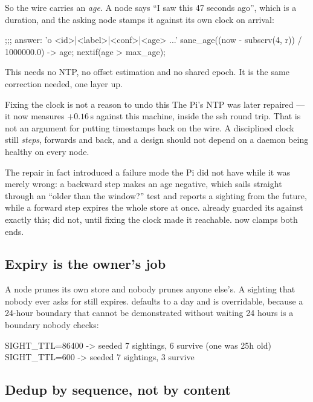 So the wire carries an \emph{age}. A node says ``I saw this 47 seconds ago'',
which is a duration, and the asking node stamps it against its own clock on
arrival:

\begin{pop}
;;; answer: 'o <id>|<label>|<conf>|<age> ...'
sane_age((now - subscrv(4, r)) / 1000000.0) -> age;
nextif(age > max_age);
\end{pop}

\noindent This needs no NTP, no offset estimation and no shared epoch. It is
the same correction  needed, one layer up.

\begin{callout}{Fixing the clock is not a reason to undo this}
The Pi's NTP was later repaired --- it now measures $+0.16$\,s against this
machine, inside the ssh round trip. That is not an argument for putting
timestamps back on the wire. A disciplined clock still \emph{steps}, forwards
and back, and a design should not depend on a daemon being healthy on every
node.

The repair in fact introduced a failure mode the Pi did not have while it was
merely wrong: a backward step makes an age negative, which sails straight
through an ``older than the window?'' test and reports a sighting from the
future, while a forward step expires the whole store at once.
 already guarded its  against exactly this;
 did not, until fixing the clock made it reachable.
 now clamps both ends.
\end{callout}

\subsection{Expiry is the owner's job}

A node prunes its own store and nobody prunes anyone else's. A sighting that
nobody ever asks for still expires.  defaults to a day and
is overridable, because a 24-hour boundary that cannot be demonstrated
without waiting 24 hours is a boundary nobody checks:

\begin{repl}
SIGHT_TTL=86400 -> seeded 7 sightings, 6 survive   (one was 25h old)
SIGHT_TTL=600   -> seeded 7 sightings, 3 survive
\end{repl}

\subsection{Dedup by sequence, not by content}

